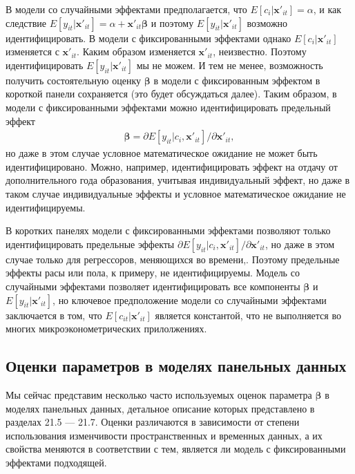 В модели со случайными эффектами предполагается, что $E [c_i | \mathbf x'_{it}] = \alpha$, и как следствие $E[y_{it} | \mathbf x'_{it}] = \alpha + \mathbf x'_{it} \bm{\beta}$ и поэтому    
$E[y_{it} | \mathbf x'_{it}]$ возможно идентифицировать. В модели с фиксированными эффектами однако $E [c_i | \mathbf x'_{it}]$ изменяется с $\mathbf x'_{it}$. Каким образом изменяется $\mathbf x'_{it}$, неизвестно. Поэтому идентифицировать $E[y_{it} | \mathbf x'_{it}]$ мы не можем. И тем не менее, возможность получить состоятельную оценку $\bm{\beta}$ в модели с фиксированным эффектом в короткой панели сохраняется (это будет обсуждаться далее). Таким образом, в модели с фиксированными эффектами можно идентифицировать предельный эффект
\begin{align}
\bm{\beta} = \partial E[y_{it} | c_i, \mathbf x'_{it}]/ \partial \mathbf x'_{it},
\nonumber
\end{align}
но даже в этом случае условное математическое ожидание не может быть идентифицировано. Можно, например, идентифицировать эффект на отдачу от дополнительного года образования, учитывая индивидуальный эффект, но даже в таком случае индивидуальные эффекты и условное математическое ожидание не идентифицируемы.

В коротких панелях модели с фиксированными эффектами позволяют только идентифицировать  предельные эффекты $\partial E[y_{it} | c_i, \mathbf x'_{it}]/ \partial \mathbf x'_{it}$, но даже в этом случае только для регрессоров, меняющихся во времени,. Поэтому предельные эффекты расы или пола, к примеру, не идентифицируемы. Модель со случайными эффектами позволяет идентифицировать все компоненты $\bm{\beta}$ и $E[y_{it}| \mathbf x'_{it}]$, но ключевое предположение модели со случайными эффектами заключается в том, что $E[c_{it}| \mathbf x'_{it}]$ является константой, что не выполняется во многих микроэконометрических прилолжениях.

\subsection{Оценки параметров в моделях панельных данных}

Мы сейчас представим несколько часто используемых оценок параметра $\bm{\beta}$ в моделях панельных данных, детальное описание которых представлено в разделах 21.5 --- 21.7. Оценки различаются в зависимости от степени использования изменчивости пространственных и временных данных, а их свойства меняются в соответствии с тем, является ли модель с фиксированными эффектами подходящей.

